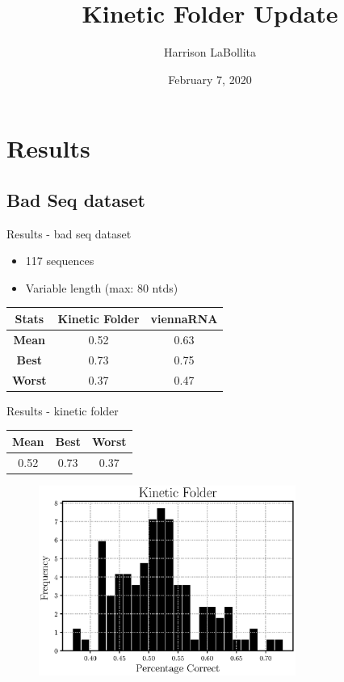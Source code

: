 \documentclass{beamer}
\author{Harrison LaBollita}
\institute{Arizona State University}
\title{Kinetic Folder Update}
\date{February 7, 2020}
\begin{document}
\frame{\titlepage}

\section*{Results}
\subsection*{Bad Seq dataset}
\begin{frame}{Results - bad seq dataset}
\begin{itemize}
\item 117 sequences
\item Variable length (max: 80 ntds)
\end{itemize}
\begin{table}
\centering
\begin{tabular}{|ccc|}
\hline
{\bf Stats} & {\bf Kinetic Folder} & {\bf viennaRNA}\\
\hline
\hline
{\bf Mean} & 0.52 & 0.63 \\
{\bf Best} & 0.73 & 0.75 \\
{\bf Worst} & 0.37 & 0.47\\
\hline
\end{tabular}
\end{table}
\end{frame}

\begin{frame}{Results - kinetic folder}
\begin{table}
\centering
\begin{tabular}{|ccc|}
\hline
{\bf Mean} & {\bf Best} & {\bf Worst}\\
\hline
\hline
0.52 & 0.73 & 0.37\\
\hline
\end{tabular}
\end{table}
\begin{figure}[H]
\centering
\includegraphics[width = 0.75\textwidth]{myfolder.eps}
\end{figure}
\end{frame}
\end{document}
